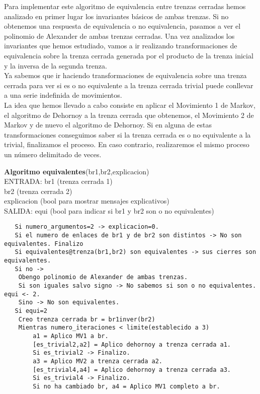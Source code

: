 Para implementar este algoritmo de equivalencia entre trenzas cerradas hemos analizado en primer lugar los invariantes básicos de ambas trenzas. Si no obtenemos una respuesta de equivalencia  o no equivalencia, pasamos a ver el polinomio de Alexander de ambas trenzas cerradas. Una vez analizados los invariantes que hemos estudiado, vamos a ir realizando transformaciones de equivalencia sobre la trenza cerrada generada por el producto de la trenza inicial y la inversa de la segunda trenza. \\

Ya sabemos que ir haciendo transformaciones de equivalencia sobre una trenza cerrada para ver si es o no equivalente a la trenza cerrada trivial puede conllevar a una serie indefinida de movimientos. \\

La idea que hemos llevado a cabo consiste en aplicar el Movimiento 1 de Markov, el algoritmo de Dehornoy a la trenza cerrada que obtenemos, el Movimiento 2 de Markov y de nuevo el algoritmo de Dehornoy. Si en alguna de estas transformaciones conseguimos saber si la trenza cerrada es o no equivalente a la trivial, finalizamos el proceso. En caso contrario, realizaremos el mismo proceso un número delimitado de veces. \\

\newpage
\begin{alg}
	\textbf{Algoritmo equivalentes}(br1,br2,explicacion)\\
	ENTRADA: br1 (trenza cerrada 1)\\
	\hspace*{2.2cm} br2 (trenza cerrada 2)\\
	\hspace*{2.2cm} explicacion (bool para mostrar mensajes explicativos)\\
	SALIDA: \hspace{0.4cm} equi (bool para indicar si br1 y br2 son o no equivalentes)
	
\begin{lstlisting}
   Si numero_argumentos=2 -> explicacion=0.
   Si el numero de enlaces de br1 y de br2 son distintos -> No son equivalentes. Finalizo
   Si equivalentes@trenza(br1,br2) son equivalentes -> sus cierres son equivalentes.
   Si no ->   
   	Obengo polinomio de Alexander de ambas trenzas.
	Si son iguales salvo signo -> No sabemos si son o no equivalentes. equi <- 2.
	Sino -> No son equivalentes.
   Si equi=2
    Creo trenza cerrada br = br1inver(br2)
    Mientras numero_iteraciones < limite(establecido a 3)
	    a1 = Aplico MV1 a br.
	    [es_trivial2,a2] = Aplico dehornoy a trenza cerrada a1. 
	    Si es_trivial2 -> Finalizo.
	    a3 = Aplico MV2 a trenza cerrada a2.
	    [es_trivial4,a4] = Aplico dehornoy a trenza cerrada a3. 
	    Si es_trivial4 -> Finalizo.
	    Si no ha cambiado br, a4 = Aplico MV1 completo a br. 
	   
\end{lstlisting}
\end{alg}


